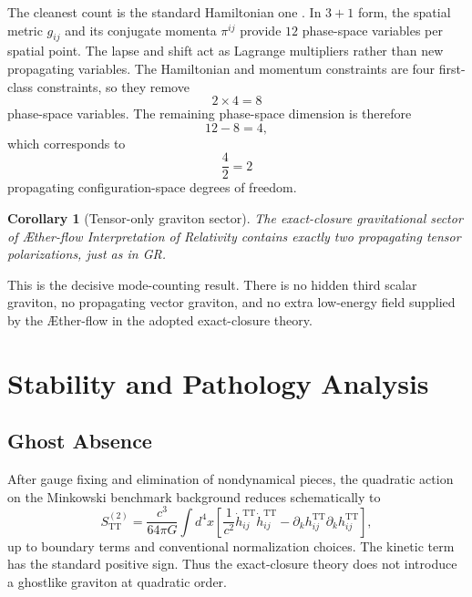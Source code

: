 \documentclass[11pt]{article}
\newcommand{\Aflow}{\AE{}ther-flow}
\newcommand{\TheoryName}{\Aflow{} Interpretation of Relativity}
\newcommand{\TT}{\mathrm{TT}}
\newtheorem{corollary}{Corollary}
\begin{document}
The cleanest count is the standard Hamiltonian one \cite{ADM1962}. In \(3+1\) form, the spatial metric \(g_{ij}\) and its conjugate momenta \(\pi^{ij}\) provide \(12\) phase-space variables per spatial point. The lapse and shift act as Lagrange multipliers rather than new propagating variables. The Hamiltonian and momentum constraints are four first-class constraints, so they remove
\begin{equation}
2\times 4 = 8
\label{eq:firstclassremoval}
\end{equation}
phase-space variables. The remaining phase-space dimension is therefore
\begin{equation}
12-8=4,
\label{eq:phasespacecount}
\end{equation}
which corresponds to
\begin{equation}
\frac{4}{2}=2
\label{eq:configcount}
\end{equation}
propagating configuration-space degrees of freedom.

\begin{corollary}[Tensor-only graviton sector]
The exact-closure gravitational sector of \TheoryName{} contains exactly two propagating tensor polarizations, just as in GR.
\end{corollary}

This is the decisive mode-counting result. There is no hidden third scalar graviton, no propagating vector graviton, and no extra low-energy field supplied by the \Aflow{} in the adopted exact-closure theory.

\section{Stability and Pathology Analysis}

\subsection{Ghost Absence}

After gauge fixing and elimination of nondynamical pieces, the quadratic action on the Minkowski benchmark background reduces schematically to
\begin{equation}
S_{\TT}^{(2)}
=
\frac{c^3}{64\pi G}
\int d^4x
\left[
\frac{1}{c^2}\dot h_{ij}^{\TT}\dot h_{ij}^{\TT}
-
\partial_k h_{ij}^{\TT}\partial_k h_{ij}^{\TT}
\right],
\label{eq:ttaction}
\end{equation}
up to boundary terms and conventional normalization choices. The kinetic term has the standard positive sign. Thus the exact-closure theory does not introduce a ghostlike graviton at quadratic order.
\end{document}
